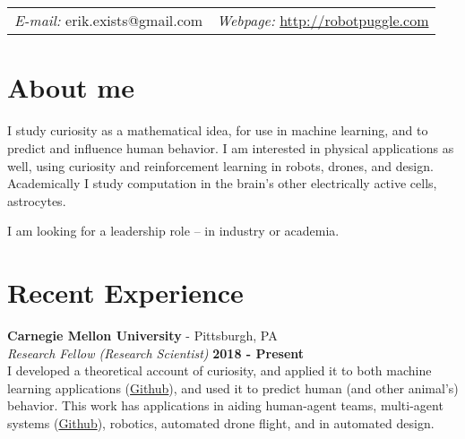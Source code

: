 \documentclass[margin,line]{res}
\begin{document}
\newcommand{\link}[1]{\texttt{#1}}
\providecommand{\tightlist}{%
    \setlength{\itemsep}{0pt}\setlength{\parskip}{0pt}}



\begin{resume}
\section{\sc }
\vspace{.05in}

\begin{tabular}{@{}p{2in}p{4in}}
{\it E-mail:}  erik.exists@gmail.com   & {\it Webpage:} \href{http://robotpuggle.com}{http://robotpuggle.com} \\
\end{tabular}

\vspace{-.1cm}
\section{\sc About me}
I study curiosity as a mathematical idea, for use in machine learning, and to predict and influence human behavior. I am interested in physical applications as well, using curiosity and reinforcement learning in robots, drones, and design. Academically I study computation in the brain’s other electrically active cells, astrocytes. 

\vspace{-.3cm}
I am looking for a leadership role -- in industry or academia.

\section{\sc Recent Experience}
\vspace{-.2cm}
{\bf Carnegie Mellon University} - Pittsburgh, PA \\
{\em Research Fellow (Research Scientist)} \hfill {\bf 2018 - Present}\\
I developed a theoretical account of curiosity, and applied it to both machine learning applications (\href{https://github.com/CoAxLab/infomercial}{Github}), and used it to predict human (and other animal's) behavior. This work has applications in aiding human-agent teams, multi-agent systems (\href{https://github.com/parenthetical-e/parkid}{Github}), robotics, automated drone flight, and in automated design.


\end{resume}
\end{document}
